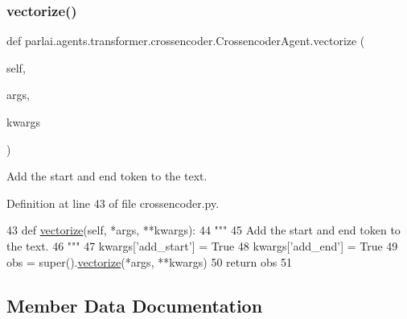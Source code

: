 \subsubsection{\texorpdfstring{vectorize()}{vectorize()}}
{\footnotesize\ttfamily def parlai.\+agents.\+transformer.\+crossencoder.\+Crossencoder\+Agent.\+vectorize (\begin{DoxyParamCaption}\item[{}]{self,  }\item[{}]{args,  }\item[{}]{kwargs }\end{DoxyParamCaption})}

\begin{DoxyVerb}Add the start and end token to the text.
\end{DoxyVerb}
 

Definition at line 43 of file crossencoder.\+py.


\begin{DoxyCode}
43     \textcolor{keyword}{def }\hyperlink{namespaceparlai_1_1agents_1_1drqa_1_1utils_a5c76cc39e3014c7bcf9199d566dbdc0f}{vectorize}(self, *args, **kwargs):
44         \textcolor{stringliteral}{"""}
45 \textcolor{stringliteral}{        Add the start and end token to the text.}
46 \textcolor{stringliteral}{        """}
47         kwargs[\textcolor{stringliteral}{'add\_start'}] = \textcolor{keyword}{True}
48         kwargs[\textcolor{stringliteral}{'add\_end'}] = \textcolor{keyword}{True}
49         obs = super().\hyperlink{namespaceparlai_1_1agents_1_1drqa_1_1utils_a5c76cc39e3014c7bcf9199d566dbdc0f}{vectorize}(*args, **kwargs)
50         \textcolor{keywordflow}{return} obs
51 
\end{DoxyCode}


\subsection{Member Data Documentation}
\mbox{\label{classparlai_1_1agents_1_1transformer_1_1crossencoder_1_1CrossencoderAgent_a991c76bbbb234ba482e3eaf3b6813bc8}} 

